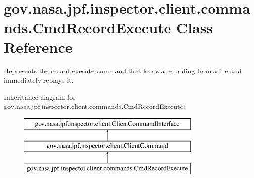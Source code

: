 \hypertarget{classgov_1_1nasa_1_1jpf_1_1inspector_1_1client_1_1commands_1_1_cmd_record_execute}{}\section{gov.\+nasa.\+jpf.\+inspector.\+client.\+commands.\+Cmd\+Record\+Execute Class Reference}
\label{classgov_1_1nasa_1_1jpf_1_1inspector_1_1client_1_1commands_1_1_cmd_record_execute}


Represents the \textquotesingle{}record execute\textquotesingle{} command that loads a recording from a file and immediately replays it.  


Inheritance diagram for gov.\+nasa.\+jpf.\+inspector.\+client.\+commands.\+Cmd\+Record\+Execute\+:\begin{figure}[H]
\begin{center}
\leavevmode
\includegraphics[height=3.000000cm]{classgov_1_1nasa_1_1jpf_1_1inspector_1_1client_1_1commands_1_1_cmd_record_execute}
\end{center}
\end{figure}
